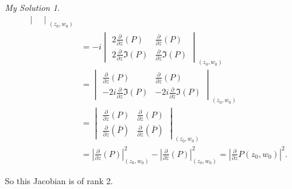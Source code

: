 \documentclass[]{article}
\theoremstyle{remark}
\newtheorem*{sol}{My Solution}
\begin{document}
\begin{sol}
\[\begin{aligned}
\begin{vmatrix}
	\end{vmatrix}_{(z_{0}, w_{0})}\\
	&=-i\begin{vmatrix}
	2\frac{\partial}{\partial z}(P)& \frac{\partial}{\partial \bar{z}}(P) \\ 
	2\frac{\partial}{\partial z}\Im(P)& \frac{\partial}{\partial \bar{z}}\Im(P)
	\end{vmatrix}_{(z_{0}, w_{0})}\\
	&=\begin{vmatrix}
	\frac{\partial}{\partial z}(P)& \frac{\partial}{\partial \bar{z}}(P) \\ 
	-2i\frac{\partial}{\partial z}\Im(P)& -2i\frac{\partial}{\partial \bar{z}}\Im(P)
	\end{vmatrix}_{(z_{0}, w_{0})}\\
	&=\begin{vmatrix}
	\frac{\partial}{\partial z}(P)& \frac{\partial}{\partial \bar{z}}(P) \\ 
	\frac{\partial}{\partial z}(\bar{P})& \frac{\partial}{\partial \bar{z}}(\bar{P})
	\end{vmatrix}_{(z_{0}, w_{0})} \\
	&= {\left| \frac{\partial}{\partial z}(P)\right| }^2_{(z_{0}, w_{0})}-{\left| \frac{\partial}{\partial \bar{z}}(P)\right| }^2_{(z_{0}, w_{0})} = {\left| \frac{\partial}{\partial z}P(z_{0}, w_{0})\right| }^2.
\end{aligned} \]
	
	So this Jacobian is of rank 2.
\end{sol}
\end{document}

